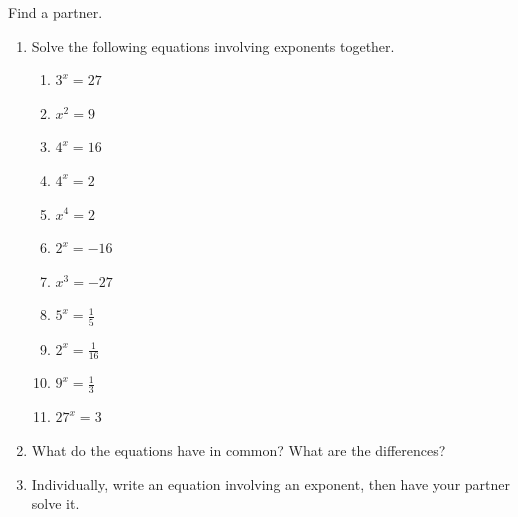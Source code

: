 \documentclass[noauthor,noinstructornotes]{ximera}
\begin{document}
\begin{problem}
Find a partner.

\begin{enumerate}
    \item Solve the following equations involving exponents together.
    \begin{enumerate}
        \item \(3^x = 27\)
        \item \(x^2 = 9\)
        \item \(4^x = 16\)
        \item \(4^x = 2\)
        \item \(x^4 = 2\)
        \item \(2^x = -16\)
        \item \(x^3 = -27\)
        \item \(5^x = \frac{1}{5}\)
        \item \(2^x = \frac{1}{16}\)
        \item \(9^x = \frac{1}{3}\)
        \item \(27^x = 3\)
    \end{enumerate}
    \item What do the equations have in common? What are the differences?
    \item Individually, write an equation involving an exponent, then have your partner solve it.
\end{enumerate}
\end{problem}
\end{document}

